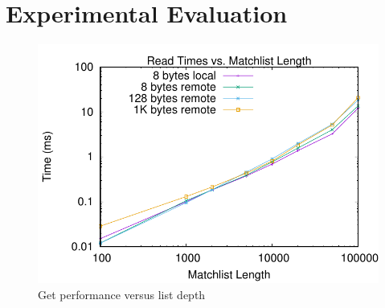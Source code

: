\section{Experimental Evaluation}

\begin{figure}
    \centering
    \includegraphics[width=\linewidth]{plots/mlen}
    \caption{Get performance versus list depth}
    \label{fig:mlen}
\end{figure}

